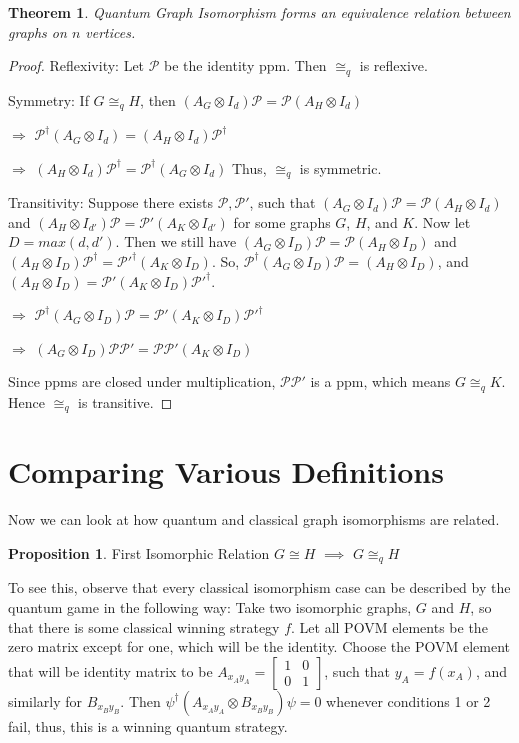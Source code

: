 \documentclass[12pt]{article}
\newtheorem{Theorem}{Theorem}
\theoremstyle{definition}
\theoremstyle{proposition}
\newtheorem{proposition}{Proposition}[section]
\theoremstyle{lemma}
\begin{document}
\begin{Theorem}
Quantum Graph Isomorphism forms an equivalence relation between graphs on $n$ vertices.
\end{Theorem}
\begin{proof}
Reflexivity: Let $\mathcal{P}$ be the identity ppm. Then $\cong_q$ is reflexive.

Symmetry: If $G \cong_q H$, then $(A_G \otimes I_d)\mathcal{P} = \mathcal{P} (A_H \otimes I_d)$

$\Rightarrow$ $\mathcal{P}^\dag (A_G \otimes I_d) = (A_H \otimes I_d) \mathcal{P}^\dag$

$\Rightarrow$ $(A_H \otimes I_d) \mathcal{P}^\dag = \mathcal{P}^\dag (A_G \otimes I_d)$
Thus, $\cong_q$ is symmetric.


Transitivity: Suppose there exists $\mathcal{P}, \mathcal{P}'$, such that $(A_G \otimes I_d)\mathcal{P} = \mathcal{P} (A_H \otimes I_d)$ and $(A_H \otimes I_{d'}) \mathcal{P} = \mathcal{P}' (A_K \otimes I_{d'})$ for some graphs $G$, $H$, and $K$. Now let $D = max(d, d')$. Then we still have $(A_G \otimes I_D)\mathcal{P} = \mathcal{P} (A_H \otimes I_D)$ and $(A_H \otimes I_{D}) \mathcal{P}^\dag = \mathcal{P}'^\dag (A_K \otimes I_{D})$. So, $\mathcal{P}^\dag (A_G \otimes I_D)\mathcal{P} = (A_H \otimes I_D)$, and $(A_H \otimes I_D) = \mathcal{P}' (A_K \otimes I_{D}) \mathcal{P}'^\dag$. 

$\Rightarrow$ $\mathcal{P}^\dag (A_G \otimes I_D)\mathcal{P} = \mathcal{P}' (A_K \otimes I_{D}) \mathcal{P}'^\dag$

$\Rightarrow$ $(A_G \otimes I_D)\mathcal{P} \mathcal{P}' = \mathcal{P} \mathcal{P}' (A_K \otimes I_{D})$

Since ppms are closed under multiplication, $\mathcal{P} \mathcal{P}'$ is a ppm, which means $G \cong_q K$. Hence $\cong_q$ is transitive.
\end{proof}


\section{Comparing Various Definitions}
Now we can look at how quantum and classical graph isomorphisms are related.


\begin{proposition}{First Isomorphic Relation}
$G \cong H$ $\implies$ $G \cong_q H$
\end{proposition}
To see this, observe that every classical isomorphism case can be described by the quantum game in the following way: Take two isomorphic graphs, $G$ and $H$, so that there is some classical winning strategy $f$. Let all POVM elements be the zero matrix except for one, which will be the identity. Choose the POVM element that will be identity matrix to be $A_{x_Ay_A} = 
\begin{bmatrix}
1 & 0 \\
0 & 1
\end{bmatrix}$, such that $y_A = f(x_A)$, and similarly for $B_{x_By_B}$. Then $\psi^\dag(A_{x_Ay_A} \otimes B_{x_By_B})\psi = 0$ whenever conditions 1 or 2 fail, thus, this is a winning quantum strategy.
\end{document}
